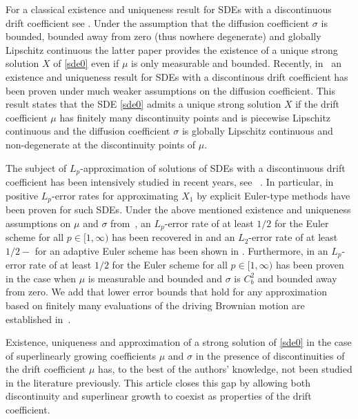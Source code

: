 \documentclass[11pt]{amsart}
\theoremstyle{plain}
\theoremstyle{definition}
\begin{document}
For a classical existence and uniqueness result for SDEs with a discontinuous drift coefficient see \cite{ MR0336813}.  Under the assumption that the  diffusion coefficient $\sigma$ is  bounded, bounded away from zero (thus nowhere degenerate)
 and globally Lipschitz continuous
  the latter paper
 provides the existence of a unique strong solution $X$ of  \eqref{sde0}  even if $\mu$ is only measurable and bounded.   Recently, in~\cite{LS16} an  existence and uniqueness result  for  SDEs  with a discontinous drift coefficient  has been proven under much weaker assumptions on the diffusion coefficient. This result states that the SDE \eqref{sde0} admits a unique strong solution $X$ if the drift coefficient $\mu$ has  finitely many discontinuity points and is piecewise Lipschitz continuous   and the diffusion coefficient $\sigma$ is globally Lipschitz continuous and non-degenerate at the  discontinuity points of $\mu$.

 The subject of $L_p$-approximation of solutions of SDEs with a discontinuous drift coefficient has been intensively studied in recent years, see ~\cite{DG18, dareiotis2021, GLN17,  LS16,  LS15b, LS18,  MGY20, MGY19b, NS19, NSS19, Tag16, Tag2017b, Tag2017a, Y21}. In particular, in \cite{DG18, dareiotis2021, LS18, MGY20, NSS19, Tag16, Tag2017b} positive $L_p$-error rates for approximating $X_1$ by explicit Euler-type methods have been proven for such SDEs.
 Under the
  above mentioned
 existence and uniqueness assumptions on $\mu$ and $\sigma$ from~\cite{LS16}, an $L_p$-error rate of at least $1/2$ for the Euler scheme for all $p\in[1, \infty)$ has been recovered in \cite{ MGY20} and an $L_2$-error rate of at least $1/2-$ for an adaptive Euler scheme has been shown in  \cite{NSS19}. Furthermore, in \cite{ dareiotis2021} an $L_p$-error rate of at least $1/2$  for the Euler scheme for all $p\in[1, \infty)$ has been proven in the case when $\mu$ is  measurable and bounded and $\sigma$ is $C^2_b$ and bounded away from zero.
 We add that lower error bounds that hold for any approximation based on finitely many evaluations of the driving Brownian motion are established in~\cite{hhmg2019,  MGY21}.

Existence, uniqueness and approximation of a strong solution of  \eqref{sde0} in the case of superlinearly growing  coefficients $\mu$ and $\sigma$ in the presence of discontinuities of the drift coefficient $\mu$
has, to the best of  the authors'  knowledge, not been studied
in the literature  previously. This article
closes   this gap by allowing both discontinuity and superlinear growth to coexist  as properties  of the drift coefficient.
\end{document}
